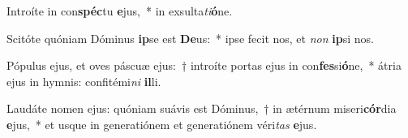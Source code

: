 \item Introíte in con\textbf{spéc}tu \textbf{e}jus,~* in exsulta\textit{ti}\textbf{ó}ne.
\item Scitóte quóniam Dóminus \textbf{ip}se est \textbf{De}us:~* ipse fecit nos, et \textit{non} \textbf{ip}si nos.
\item Pópulus ejus, et oves páscuæ ejus:~† introíte portas ejus in con\textbf{fes}si\textbf{ó}ne,~* átria ejus in hymnis: confitémi\textit{ni} \textbf{il}li.
\item Laudáte nomen ejus: quóniam suávis est Dóminus,~† in ætérnum miseri\textbf{cór}dia \textbf{e}jus,~* et usque in generatiónem et generatiónem véri\textit{tas} \textbf{e}jus.
